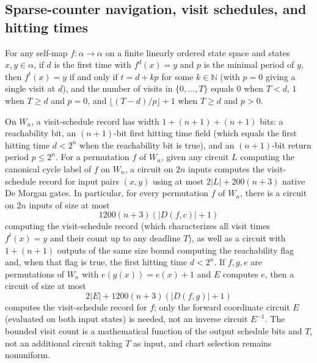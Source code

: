 \begin{result}
\subsection{Sparse-counter navigation, visit schedules, and hitting times}
For any self-map $f:\alpha\to\alpha$ on a finite linearly ordered state space
and states $x,y\in\alpha$, if $d$ is the first time with $f^d(x)=y$ and $p$ is
the minimal period of $y$, then $f^t(x)=y$ if and only if $t=d+kp$ for some
$k\in\mathbb N$ (with $p=0$ giving a single visit at $d$), and the number of
visits in $\{0,\dots,T\}$ equals $0$ when $T<d$, $1$ when $T\ge d$ and $p=0$,
and $\lfloor(T-d)/p\rfloor+1$ when $T\ge d$ and $p>0$.

On $W_n$, a visit-schedule record has width $1+(n+1)+(n+1)$ bits: a
reachability bit, an $(n+1)$-bit first hitting time field (which equals the
first hitting time $d<2^n$ when the reachability bit is true), and an
$(n+1)$-bit return period $p\le 2^n$. For a permutation $f$ of $W_n$, given any
circuit $L$ computing the canonical cycle label of $f$ on $W_n$, a circuit on
$2n$ inputs computes the visit-schedule record for input pairs $(x,y)$ using at
most $2|L|+200(n+3)$ native De Morgan gates. In particular, for every
permutation $f$ of $W_n$, there is a circuit on $2n$ inputs of size at most
\[
1200(n+3)(|D(f,c)|+1)
\]
computing the visit-schedule record (which characterizes all visit times
$f^t(x)=y$ and their count up to any deadline $T$), as well as a circuit with
$1+(n+1)$ outputs of the same size bound computing the reachability flag and,
when that flag is true, the first hitting time $d<2^n$. If $f,g,e$ are
permutations of $W_n$ with $e(g(x))=e(x)+1$ and $E$ computes $e$, then a
circuit of size at most
\[
2|E|+1200(n+3)(|D(f,g)|+1)
\]
computes the visit-schedule record for $f$; only the forward coordinate circuit
$E$ (evaluated on both input states) is needed, not an inverse circuit
$E^{-1}$. The bounded visit count is a mathematical function of the output
schedule bits and $T$, not an additional circuit taking $T$ as input, and chart
selection remains nonuniform.\citep{Schlesinger2026IteratedFunctions}

\end{result}
